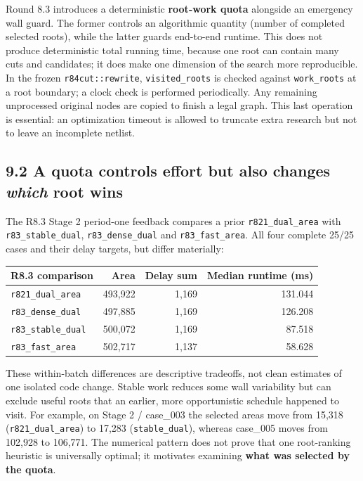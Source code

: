 Round 8.3 introduces a deterministic \textbf{root-work quota} alongside an emergency wall guard. The former controls an algorithmic quantity (number of completed selected roots), while the latter guards end-to-end runtime. This does not produce deterministic total running time, because one root can contain many cuts and candidates; it does make one dimension of the search more reproducible. In the frozen \texttt{r84cut::rewrite}, \texttt{visited\_roots} is checked against \texttt{work\_roots} at a root boundary; a clock check is performed periodically. Any remaining unprocessed original nodes are copied to finish a legal graph. This last operation is essential: an optimization timeout is allowed to truncate extra research but not to leave an incomplete netlist.

\subsection{\texorpdfstring{9.2 A quota controls effort but also changes \emph{which} root wins}{9.2 A quota controls effort but also changes which root wins}}\label{a-quota-controls-effort-but-also-changes-which-root-wins}

The R8.3 Stage 2 period-one feedback compares a prior \texttt{r821\_dual\_area} with \texttt{r83\_stable\_dual}, \texttt{r83\_dense\_dual} and \texttt{r83\_fast\_area}. All four complete 25/25 cases and their delay targets, but differ materially:

\begin{longtable}[]{@{}lrrr@{}}
\toprule\noalign{}
R8.3 comparison & Area & Delay sum & Median runtime (ms) \\
\midrule\noalign{}
\endhead
\bottomrule\noalign{}
\endlastfoot
\texttt{r821\_dual\_area} & 493,922 & 1,169 & 131.044 \\
\texttt{r83\_dense\_dual} & 497,885 & 1,169 & 126.208 \\
\texttt{r83\_stable\_dual} & 500,072 & 1,169 & 87.518 \\
\texttt{r83\_fast\_area} & 502,717 & 1,137 & 58.628 \\
\end{longtable}

These within-batch differences are descriptive tradeoffs, not clean estimates of one isolated code change. Stable work reduces some wall variability but can exclude useful roots that an earlier, more opportunistic schedule happened to visit. For example, on Stage 2 / case\_003 the selected areas move from 15,318 (\texttt{r821\_dual\_area}) to 17,283 (\texttt{stable\_dual}), whereas case\_005 moves from 102,928 to 106,771. The numerical pattern does not prove that one root-ranking heuristic is universally optimal; it motivates examining \textbf{what was selected by the quota}.

